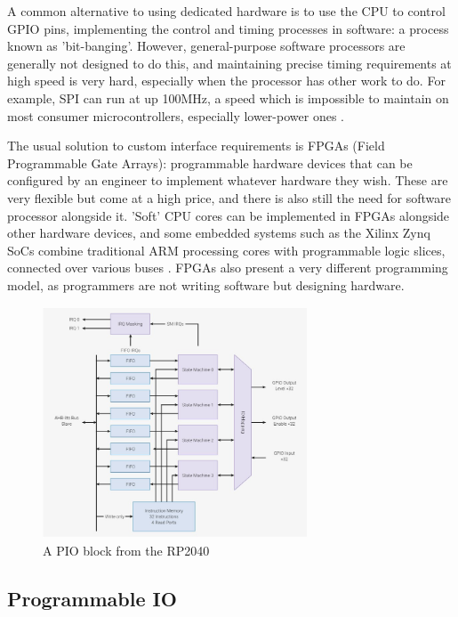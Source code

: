 \documentclass[a4paper,fleqn,12pt]{article}
\begin{document}
A common alternative to using dedicated hardware is to use the CPU to control GPIO pins, implementing the control and timing processes in software: a process known as 'bit-banging'. However, general-purpose software processors are generally not designed to do this, and maintaining precise timing requirements at high speed is very hard, especially when the processor has other work to do. For example, SPI can run at up 100MHz, a speed which is impossible to maintain on most consumer microcontrollers, especially lower-power ones \citep{picosdk}.

The usual solution to custom interface requirements is FPGAs (Field Programmable Gate Arrays): programmable hardware devices that can be configured by an engineer to implement whatever hardware they wish. These are very flexible but come at a high price, and there is also still the need for software processor alongside it. 'Soft' CPU cores can be implemented in FPGAs alongside other hardware devices, and some embedded systems such as the Xilinx Zynq SoCs combine traditional ARM processing cores with programmable logic slices, connected over various buses \citep{zynq}. FPGAs also present a very different programming model, as programmers are not writing software but designing hardware.


\begin{figure}[b!]
    \centering
    \includegraphics[width=0.7\textwidth]{../img/pio-block.jpg}
    \caption{A PIO block from the RP2040 \citep{rp2040}}
    \label{fig:pio-block}
\end{figure}

\subsection{Programmable IO}
\end{document}
